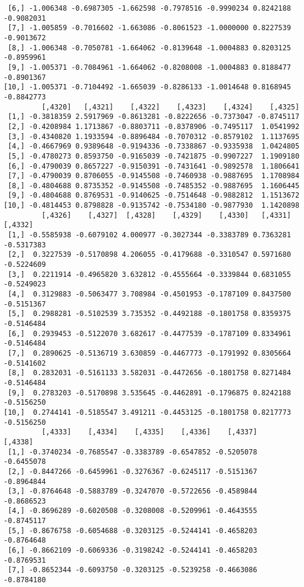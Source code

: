 \documentclass[
  letterpaper,
  DIV=11,
  numbers=noendperiod]{scrreprt}
\begin{document}
\begin{verbatim}
 [6,] -1.006348 -0.6987305 -1.662598 -0.7978516 -0.9990234 0.8242188 -0.9082031
 [7,] -1.005859 -0.7016602 -1.663086 -0.8061523 -1.0000000 0.8227539 -0.9013672
 [8,] -1.006348 -0.7050781 -1.664062 -0.8139648 -1.0004883 0.8203125 -0.8959961
 [9,] -1.005371 -0.7084961 -1.664062 -0.8208008 -1.0004883 0.8188477 -0.8901367
[10,] -1.005371 -0.7104492 -1.665039 -0.8286133 -1.0014648 0.8168945 -0.8842773
         [,4320]   [,4321]    [,4322]    [,4323]    [,4324]    [,4325]
 [1,] -0.3818359 2.5917969 -0.8613281 -0.8222656 -0.7373047 -0.8745117
 [2,] -0.4208984 1.1713867 -0.8803711 -0.8378906 -0.7495117  1.0541992
 [3,] -0.4340820 1.1933594 -0.8896484 -0.7070312 -0.8579102  1.1137695
 [4,] -0.4667969 0.9389648 -0.9194336 -0.7338867 -0.9335938  1.0424805
 [5,] -0.4780273 0.8593750 -0.9165039 -0.7421875 -0.9907227  1.1909180
 [6,] -0.4790039 0.8657227 -0.9150391 -0.7431641 -0.9892578  1.1806641
 [7,] -0.4790039 0.8706055 -0.9145508 -0.7460938 -0.9887695  1.1708984
 [8,] -0.4804688 0.8735352 -0.9145508 -0.7485352 -0.9887695  1.1606445
 [9,] -0.4804688 0.8769531 -0.9140625 -0.7514648 -0.9882812  1.1513672
[10,] -0.4814453 0.8798828 -0.9135742 -0.7534180 -0.9877930  1.1420898
         [,4326]    [,4327]  [,4328]    [,4329]    [,4330]   [,4331]    [,4332]
 [1,] -0.5585938 -0.6079102 4.000977 -0.3027344 -0.3383789 0.7363281 -0.5317383
 [2,]  0.3227539 -0.5170898 4.206055 -0.4179688 -0.3310547 0.5971680 -0.5224609
 [3,]  0.2211914 -0.4965820 3.632812 -0.4555664 -0.3339844 0.6831055 -0.5249023
 [4,]  0.3129883 -0.5063477 3.708984 -0.4501953 -0.1787109 0.8437500 -0.5151367
 [5,]  0.2988281 -0.5102539 3.735352 -0.4492188 -0.1801758 0.8359375 -0.5146484
 [6,]  0.2939453 -0.5122070 3.682617 -0.4477539 -0.1787109 0.8334961 -0.5146484
 [7,]  0.2890625 -0.5136719 3.630859 -0.4467773 -0.1791992 0.8305664 -0.5141602
 [8,]  0.2832031 -0.5161133 3.582031 -0.4472656 -0.1801758 0.8271484 -0.5146484
 [9,]  0.2783203 -0.5170898 3.535645 -0.4462891 -0.1796875 0.8242188 -0.5156250
[10,]  0.2744141 -0.5185547 3.491211 -0.4453125 -0.1801758 0.8217773 -0.5156250
         [,4333]    [,4334]    [,4335]    [,4336]    [,4337]    [,4338]
 [1,] -0.3740234 -0.7685547 -0.3383789 -0.6547852 -0.5205078 -0.6455078
 [2,] -0.8447266 -0.6459961 -0.3276367 -0.6245117 -0.5151367 -0.8964844
 [3,] -0.8764648 -0.5883789 -0.3247070 -0.5722656 -0.4589844 -0.8686523
 [4,] -0.8696289 -0.6020508 -0.3208008 -0.5209961 -0.4643555 -0.8745117
 [5,] -0.8676758 -0.6054688 -0.3203125 -0.5244141 -0.4658203 -0.8764648
 [6,] -0.8662109 -0.6069336 -0.3198242 -0.5244141 -0.4658203 -0.8769531
 [7,] -0.8652344 -0.6093750 -0.3203125 -0.5239258 -0.4663086 -0.8784180

\end{verbatim}
\end{document}
